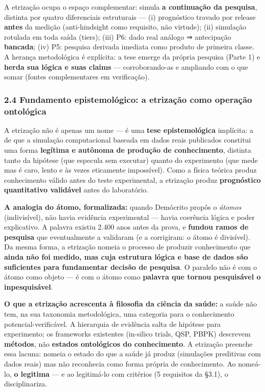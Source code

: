 \documentclass[
  10pt,
]{article}
\begin{document}
A etrização ocupa o espaço complementar: simula \textbf{a continuação da
pesquisa}, distinta por quatro diferenciais estruturais --- (i)
prognóstico travado por release \textbf{antes} da medição
(anti-hindsight como requisito, não virtude); (ii) simulação rotulada em
toda saída (tiers); (iii) P6: dado real análogo ⇒ antecipação
\textbf{bancada}; (iv) P5: pesquisa derivada imediata como produto de
primeira classe. A herança metodológica é explícita: a tese emerge da
própria pesquisa (Parte 1) e \textbf{herda sua lógica e suas claims} ---
corroborando-as e ampliando com o que somar (fontes complementares em
verificação).

\hypertarget{fundamento-epistemoluxf3gico-a-etrizauxe7uxe3o-como-operauxe7uxe3o-ontoluxf3gica}{%
\subsubsection{2.4 Fundamento epistemológico: a etrização como operação
ontológica}\label{fundamento-epistemoluxf3gico-a-etrizauxe7uxe3o-como-operauxe7uxe3o-ontoluxf3gica}}

A etrização não é apenas um nome --- é uma \textbf{tese epistemológica}
implícita: a de que a simulação computacional baseada em dados reais
publicados constitui uma forma \textbf{legítima e autônoma de produção
de conhecimento}, distinta tanto da hipótese (que especula sem executar)
quanto do experimento (que mede mas é caro, lento e às vezes eticamente
impossível). Como a física teórica produz conhecimento válido antes do
teste experimental, a etrização produz \textbf{prognóstico quantitativo
validável} antes do laboratório.

\textbf{A analogia do átomo, formalizada:} quando Demócrito propôs o
\emph{átomos} (indivisível), não havia evidência experimental --- havia
coerência lógica e poder explicativo. A palavra existiu 2.400 anos antes
da prova, e \textbf{fundou ramos de pesquisa} que eventualmente a
validaram (e a corrigiram: o átomo é divisível). Da mesma forma, a
etrização nomeia o processo de produzir conhecimento que \textbf{ainda
não foi medido, mas cuja estrutura lógica e base de dados são
suficientes para fundamentar decisão de pesquisa}. O paralelo não é com
o átomo como objeto --- é com o átomo como \textbf{palavra que tornou
pesquisável o inpesquisável}.

\textbf{O que a etrização acrescenta à filosofia da ciência da saúde:} a
saúde não tem, na sua taxonomia metodológica, uma categoria para o
conhecimento potencial-verificável. A hierarquia de evidência salta de
hipótese para experimento; os frameworks existentes (in-silico trials,
QSP, PBPK) descrevem \textbf{métodos}, não \textbf{estados ontológicos
do conhecimento}. A etrização preenche essa lacuna: nomeia o estado do
que a saúde já produz (simulações preditivas com dados reais) mas não
reconhecia como forma própria de conhecimento. Ao nomeá-lo, \textbf{o
legitima} --- e ao legitimá-lo com critérios (5 requisitos da §3.1), o
disciplinariza.
\end{document}
